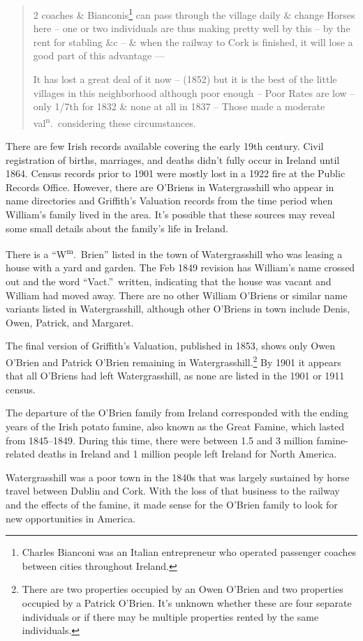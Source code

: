 \begin{quote}
	2 coaches \& Bianconis\footnote{Charles Bianconi was an Italian entrepreneur who operated passenger coaches between cities throughout Ireland.\citep{Bianconi}} can pass through the village daily \& change Horses here -- one or two individuals are thus making pretty well by this -- by the rent for stabling \&c -- \& when the railway to Cork is finished, it will lose a good part of this advantage ---
	
	It has lost a great deal of it now -- (1852) but it is the best of the little villages in this neighborhood although poor enough -- Poor Rates are low -- only 1/7th for 1832 \& none at all in 1837 -- Those made a moderate val\textsuperscript{n}.\ considering these circumstances.\citep{HouseIntro}
\end{quote}

There are few Irish records available covering the early 19th century. Civil registration of births, marriages, and deaths didn't fully occur in Ireland until 1864.\citep{Grenham1} Census records prior to 1901 were mostly lost in a 1922 fire at the Public Records Office.\citep{Grenham18} However, there are O'Briens in Watergrasshill who appear in name directories and Griffith's Valuation records from the time period when William's family lived in the area. It's possible that these sources may reveal some small details about the family's life in Ireland. 

There is a ``W\textsuperscript{m}.\ Brien'' listed in the town of Watergrasshill who was leasing a house with a yard and garden.\cite{House1849:4} The Feb 1849 revision has William's name crossed out and the word ``Vact.''\ written, indicating that the house was vacant and William had moved away.\citep{House1849-2} There are no other William O'Briens or similar name variants listed in Watergrasshill, although other O'Briens in town include Denis,\cite{House1849:6dennis} Owen,\cite{House1849:6owen} Patrick,\cite{House1849:7} and Margaret.\cite{House1849:11}

The final version of Griffith's Valuation, published in 1853, shows only Owen O'Brien\cite{Griffiths:46,Griffiths:90} and Patrick O'Brien\cite{Griffiths:90} remaining in Watergrasshill.\footnote{There are two properties occupied by an Owen O'Brien and two properties occupied by a Patrick O'Brien. It's unknown whether these are four separate individuals or if there may be multiple properties rented by the same individuals.} By 1901 it appears that all O'Briens had left Watergrasshill, as none are listed in the 1901 or 1911 census.\cite{1901IrishCensus,1911IrishCensus}

The departure of the O'Brien family from Ireland corresponded with the ending years of the Irish potato famine, also known as the Great Famine, which lasted from 1845--1849. During this time, there were between 1.5 and 3 million famine-related deaths in Ireland and 1 million people left Ireland for North America.\cite{Smith:469}

Watergrasshill was a poor town in the 1840s that was largely sustained by horse travel between Dublin and Cork. With the loss of that business to the railway and the effects of the famine, it made sense for the O'Brien family to look for new opportunities in America.


